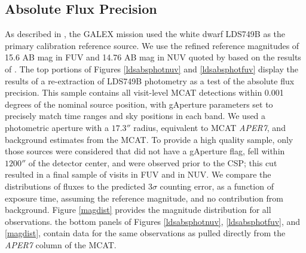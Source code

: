 \documentclass[trackchanges,preprint2]{aastex}
\begin{document}
\subsection{Absolute Flux Precision}
As described in \citet{mor2007}, the GALEX mission used the white dwarf LDS749B as the primary calibration reference source. We use the refined reference magnitudes of 15.6 AB mag in FUV and 14.76 AB mag in NUV quoted by \citet{camarota2014white} based on the results of \citet{bohlin2008absolute}. The top portions of Figures \ref{ldsabsphotnuv} and \ref{ldsabsphotfuv} display the results of a re-extraction of LDS749B photometry  as a test of the absolute flux precision. This sample contains all visit-level MCAT detections within 0.001 degrees of the nominal source position, with gAperture parameters set to precisely match time ranges and sky positions in each band. We used a photometric aperture with a $17.3''$ radius, equivalent to MCAT \emph{APER7}, and background estimates from the MCAT.  To provide a high quality sample, only those sources were considered that did not have a gAperture flag, fell within $1200''$ of the detector center, and were observed prior to the CSP; this cut resulted in a final sample of  visits in FUV and  in NUV. We compare the distributions of fluxes to the predicted 3$\sigma$ counting error, as a function of exposure time, assuming the reference magnitude,  and no contribution from background. Figure \ref{magdist} provides the magnitude distribution for all observations.  the bottom panels of Figures \ref{ldsabsphotnuv}, \ref{ldsabsphotfuv}, and \ref{magdist}, contain data for the same observations as pulled directly from the \emph{APER7} column of the MCAT.
\end{document}
